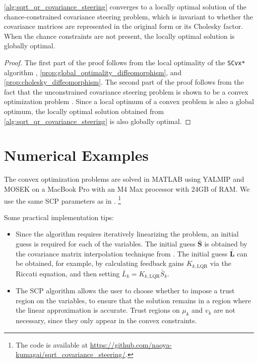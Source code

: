 \documentclass{IEEEtran}
\begin{document}
\begin{theorem}
	\cref{alg:sqrt_qr_covariance_steering} converges to a locally optimal solution of the chance-constrained covariance steering problem, which is invariant to whether the covariance matrices are represented in the original form or its Cholesky factor. When the chance constraints are not present, the locally optimal solution is globally optimal.
\end{theorem}
\begin{proof}
	The first part of the proof follows from the local optimality of the \texttt{SCvx*} algorithm \cite[Theorem 3]{oguriSuccessiveConvexificationFeasibility2023a}, \cref{prop:global_optimality_diffeomorphism}, and \cref{prop:cholesky_diffeomorphism}. The second part of the proof follows from the fact that the unconstrained covariance steering problem is shown to be a convex optimization problem \cite{liuOptimalCovarianceSteering2025}. Since a local optimum of a convex problem is also a global optimum, the locally optimal solution obtained from \cref{alg:sqrt_qr_covariance_steering} is also globally optimal.
\end{proof}



\section{Numerical Examples}
The convex optimization problems are solved in MATLAB using YALMIP \cite{lofbergYALMIPToolboxModeling2004} and MOSEK \cite{mosekapsMOSEKOptimizationToolbox2025} on a MacBook Pro with an M4 Max processor with 24GB of RAM. We use the same SCP parameters as in \cite{oguriSuccessiveConvexificationFeasibility2023a}.
\footnote{The code is available at \url{https://github.com/naoya-kumagai/sqrt_covariance_steering/}.}

Some practical implementation tips:
\begin{itemize}
	\item Since the algorithm requires iteratively linearizing the problem, an initial guess is required for each of the variables. The initial guess \( \bar{\bm{S}} \) is obtained by the covariance matrix interpolation technique from \cite{linRiemannianGeometrySymmetric2019}. The initial guess \( \bar{\bm{L}} \) can be obtained, for example, by calculating feedback gains \(K_{k,\mathrm{LQR}} \) via the Riccati equation, and then setting \( \bar{L}_k = K_{k,\mathrm{LQR}} \bar{S}_k \).
	\item The SCP algorithm allows the user to choose whether to impose a trust region on the variables, to ensure that the solution remains in a region where the linear approximation is accurate. 
	Trust regions on \( \mu_k \) and \( v_k \) are not necessary, since they only appear in the convex constraints.
\end{itemize}
\end{document}
